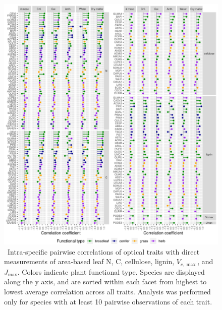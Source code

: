 \begin{figure}
  \centering
  \includegraphics[width=\textwidth]{figures/trait_correlations_lollipop.pdf}
  \caption{\
    Intra-specific pairwise correlations of optical traits with direct measurements of area-based
    leaf N, C, cellulose, lignin, $V_{c,\max}$, and $J_{\max}$.
    Colors indicate plant functional type.
    Species are displayed along the y axis, and are sorted within each facet from highest to lowest average correlation across all traits.
    Analysis was performed only for species with at least 10 pairwise observations of each trait.
  }\label{fig:trait_correlations}
\end{figure}

